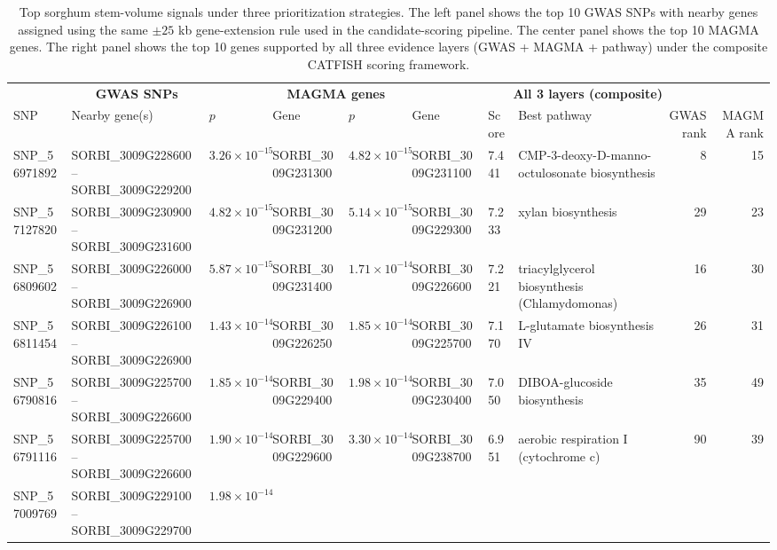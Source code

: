 \documentclass[unnumsec,webpdf,contemporary,large]{oup-authoring-template}%
\theoremstyle{thmstyleone}%
\theoremstyle{thmstyletwo}%
\theoremstyle{thmstylethree}%
\begin{document}
\begin{table}[ht]
\centering
\caption{Top sorghum stem-volume signals under three prioritization strategies. The left panel shows the top 10 GWAS SNPs with nearby genes assigned using the same $\pm 25$ kb gene-extension rule used in the candidate-scoring pipeline. The center panel shows the top 10 MAGMA genes. The right panel shows the top 10 genes supported by all three evidence layers (GWAS + MAGMA + pathway) under the composite CATFISH scoring framework.}
\label{tab:sap_stem_volume_top10_layers}
\scriptsize
\begin{tabular}{p{} p{} p{} p{} p{} p{} p{} p{} rr}
\hline
\multicolumn{3}{c}{\textbf{GWAS SNPs}} &
\multicolumn{2}{c}{\textbf{MAGMA genes}} &
\multicolumn{5}{c}{\textbf{All 3 layers (composite)}} \\
SNP & Nearby gene(s) & $p$ &
Gene & $p$ &
Gene & Score & Best pathway & GWAS rank & MAGMA rank \\
\hline
SNP\_56971892 & SORBI\_3009G228600--SORBI\_3009G229200 & $3.26\times10^{-15}$ &
SORBI\_3009G231300 & $4.82\times10^{-15}$ &
SORBI\_3009G231100 & 7.441 & CMP-3-deoxy-D-manno-octulosonate biosynthesis & 8 & 15 \\
SNP\_57127820 & SORBI\_3009G230900--SORBI\_3009G231600 & $4.82\times10^{-15}$ &
SORBI\_3009G231200 & $5.14\times10^{-15}$ &
SORBI\_3009G229300 & 7.233 & xylan biosynthesis & 29 & 23 \\
SNP\_56809602 & SORBI\_3009G226000--SORBI\_3009G226900 & $5.87\times10^{-15}$ &
SORBI\_3009G231400 & $1.71\times10^{-14}$ &
SORBI\_3009G226600 & 7.221 & triacylglycerol biosynthesis (Chlamydomonas) & 16 & 30 \\
SNP\_56811454 & SORBI\_3009G226100--SORBI\_3009G226900 & $1.43\times10^{-14}$ &
SORBI\_3009G226250 & $1.85\times10^{-14}$ &
SORBI\_3009G225700 & 7.170 & L-glutamate biosynthesis IV & 26 & 31 \\
SNP\_56790816 & SORBI\_3009G225700--SORBI\_3009G226600 & $1.85\times10^{-14}$ &
SORBI\_3009G229400 & $1.98\times10^{-14}$ &
SORBI\_3009G230400 & 7.050 & DIBOA-glucoside biosynthesis & 35 & 49 \\
SNP\_56791116 & SORBI\_3009G225700--SORBI\_3009G226600 & $1.90\times10^{-14}$ &
SORBI\_3009G229600 & $3.30\times10^{-14}$ &
SORBI\_3009G238700 & 6.951 & aerobic respiration I (cytochrome c) & 90 & 39 \\
SNP\_57009769 & SORBI\_3009G229100--SORBI\_3009G229700 & $1.98\times10^{-14}$ &

\end{tabular}
\end{table}
\end{document}
